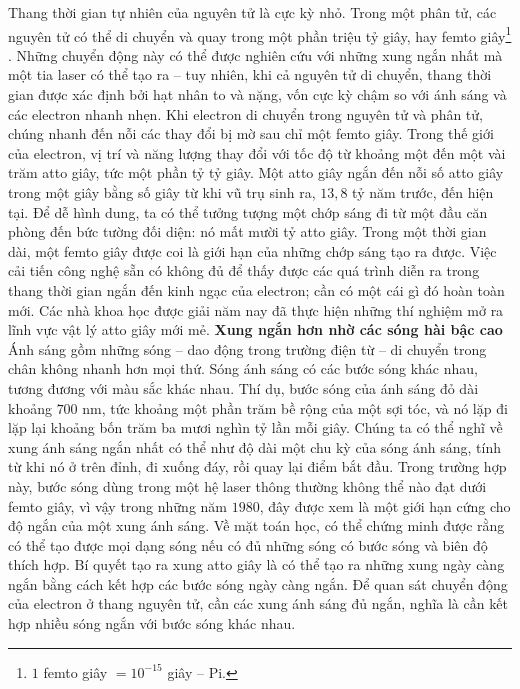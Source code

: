 \begin{multicols}{2}
	\vskip 0.1cm
	Thang thời gian tự nhiên của nguyên tử là cực kỳ nhỏ. Trong một phân tử, các nguyên tử có thể di chuyển và quay trong một phần triệu tỷ giây, hay femto giây\footnote[5]{\color{timhieukhoahoc}$1$ femto giây $= 10^{-15}$ giây -- Pi.} . Những chuyển động này có thể được nghiên cứu với những xung ngắn nhất mà một tia laser có thể tạo ra -- tuy nhiên, khi cả nguyên tử di chuyển, thang thời gian được xác định bởi hạt nhân to và nặng, vốn cực kỳ chậm so với ánh sáng và các electron nhanh nhẹn.
	\vskip 0.1cm
	Khi electron di chuyển trong nguyên tử và phân tử, chúng nhanh đến nỗi các thay đổi bị mờ sau chỉ một femto giây. Trong thế giới của electron, vị trí và năng lượng thay đổi với tốc độ từ khoảng một đến một vài trăm atto giây, tức một phần tỷ tỷ giây.
	\vskip 0.1cm
	Một atto giây ngắn đến nỗi số atto giây trong một giây bằng số giây từ khi vũ trụ sinh ra, $13{,}8$ tỷ năm trước, đến hiện tại. Để dễ hình dung, ta có thể tưởng tượng một chớp sáng đi từ một đầu căn phòng đến bức tường đối diện: nó mất mười tỷ atto giây.
	\vskip 0.1cm
	Trong một thời gian dài, một femto giây được coi là giới hạn của những chớp sáng tạo ra được.
	\vskip 0.1cm
	Việc cải tiến công nghệ sẵn có không đủ để thấy được các quá trình diễn ra trong thang thời gian ngắn đến kinh ngạc của electron; cần có một cái gì đó hoàn toàn mới. Các nhà khoa học được giải năm nay đã thực hiện những thí nghiệm mở ra lĩnh vực vật lý atto giây mới mẻ.
	\vskip 0.1cm
	\textbf{\color{timhieukhoahoc}Xung ngắn hơn nhờ các sóng hài bậc cao}
	\vskip 0.1cm
	Ánh sáng gồm những sóng -- dao động trong trường điện từ -- di chuyển trong chân không nhanh hơn mọi thứ. Sóng ánh sáng có các bước sóng khác nhau, tương đương với màu sắc khác nhau. Thí dụ, bước sóng của ánh sáng đỏ dài khoảng $700$ nm, tức khoảng một phần trăm bề rộng của một sợi tóc, và nó lặp đi lặp lại khoảng bốn trăm ba mươi nghìn tỷ lần mỗi giây. Chúng ta có thể nghĩ về xung ánh sáng ngắn nhất có thể như độ dài một chu kỳ của sóng ánh sáng, tính từ khi nó ở trên đỉnh, đi xuống đáy, rồi quay lại điểm bắt đầu. Trong trường hợp này, bước sóng dùng trong một hệ laser thông thường không thể nào đạt dưới femto giây, vì vậy trong những năm $1980$, đây được xem là một giới hạn cứng cho độ ngắn của một xung ánh sáng.
	\vskip 0.1cm
	Về mặt toán học, có thể chứng minh được rằng có thể tạo được mọi dạng sóng nếu có đủ những sóng có bước sóng và biên độ thích hợp. Bí quyết tạo ra xung atto giây là có thể tạo ra những xung ngày càng ngắn bằng cách kết hợp các bước sóng ngày càng ngắn.
	\vskip 0.1cm
	Để quan sát chuyển động của electron ở thang nguyên tử, cần các xung ánh sáng đủ ngắn, nghĩa là cần kết hợp nhiều sóng ngắn với bước sóng khác nhau.

\end{multicols}

